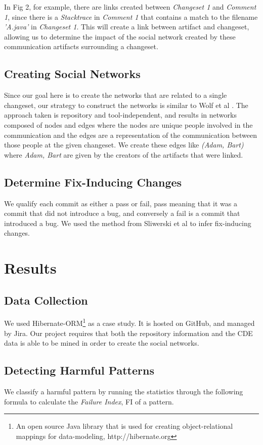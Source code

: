 \documentclass[conference]{IEEEtran}
\begin{document}
In Fig 2, for example, there are links created between \emph{Changeset 1} and \emph{Comment 1}, since there is a \emph{Stacktrace} in \emph{Comment 1} that contains a match to the filename \emph{'A.java'} in \emph{Changeset 1}.  This will create a link between artifact and changeset, allowing us to determine the impact of the social network created by these communication artifacts surrounding a changeset.

\subsection{Creating Social Networks} 
Since our goal here is to create the networks that are related to a single changeset, our strategy to construct the networks is similar to Wolf et al \cite{4721184}.  The approach taken is repository and tool-independent, and results in networks composed of nodes and edges where the nodes are unique people involved in the communication and the edges are a representation of the communication between those people at the given changeset.  We create these edges like \emph{(Adam, Bart)} where \emph{Adam, Bart} are given by the creators of the artifacts that were linked.   

\subsection{Determine Fix-Inducing Changes}
We qualify each commit as either a pass or fail, pass meaning that it was a commit that did not introduce a bug, and conversely a fail is a commit that introduced a bug.  We used the method from Sliwerski et al \cite{Sliwerski:2005:CIF:1083142.1083147} to infer fix-inducing changes. 

\section{Results}
\subsection{Data Collection}
We used Hibernate-ORM\footnote{An open source Java library that is used for creating object-relational mappings for data-modeling, http://hibernate.org} as a case study.  It is hosted on GitHub, and managed by Jira\footnotemark[2].  Our project requires that both the repository information and the CDE data is able to be mined in order to create the social networks.

\subsection{Detecting Harmful Patterns} 
We classify a harmful pattern by running the statistics through the following formula to calculate the \emph{Failure Index}, FI of a pattern.
\end{document}
